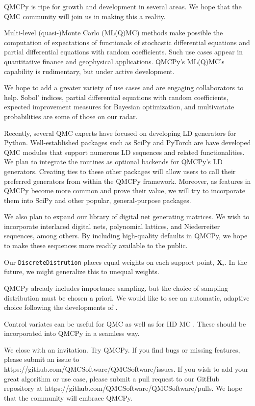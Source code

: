 \documentclass[graybox]{svmult}
\begin{document}
QMCPy is ripe for growth and development in several areas.  We hope that the QMC community will join us in making this a reality.

Multi-level (quasi-)Monte Carlo (ML(Q)MC) methods make possible the computation of expectations of functionals of stochastic differential equations and partial differential equations with random coefficients.  Such use cases appear in quantitative finance and geophysical applications.  QMCPy's ML(Q)MC's capability is rudimentary, but under active development.

We hope to add a greater variety of use cases and are engaging collaborators to help.  Sobol' indices, partial differential equations with random coefficients, expected improvement measures for Bayesian optimization, and multivariate probabilities are some of those on our radar.

Recently, several QMC experts have focused on developing LD generators for Python. 
Well-established packages such as SciPy \cite{SCIPY} and PyTorch \cite{PyTorch} are have developed QMC modules that support numerous LD sequences and related functionalities. We plan to integrate the routines as optional backends for QMCPy's LD generators. Creating ties to these other packages will allow users to call their preferred generators from within the QMCPy framework.  Moreover, as features in QMCPy become more common and prove their value, we will try to incorporate them into SciPy and other popular, general-purpose packages.

We also plan to expand our library of digital net generating matrices. We wish to incorporate interlaced digital nets, polynomial lattices, and Niederreiter sequences, among others. By including high-quality defaults in QMCPy, we hope to make these sequences more readily available to the public. 

Our \texttt{DiscreteDistrution} places equal weights on each support point, $\boldsymbol{X}_i$.  In the future, we might generalize this to unequal weights.

QMCPy already includes importance sampling, but the choice of sampling distribution must be chosen a priori.  We would like to see an automatic, adaptive choice following the developments of \cite{AsmGly2007a,approx_zero_variance_simulation,OweZho00a}.

Control variates can be useful for QMC as well as for IID MC \cite{HicEtal03}.  These should be incorporated into QMCPy in a seamless way.

We close with an invitation.  Try QMCPy.  If you find bugs or missing features, please submit an issue to https://github.com/QMCSoftware/QMCSoftware/issues.  
If you wish to add your great algorithm or use case, please submit a pull request to our GitHub repository at https://github.com/QMCSoftware/QMCSoftware/pulls. 
We hope that the community will embrace QMCPy.
\end{document}

